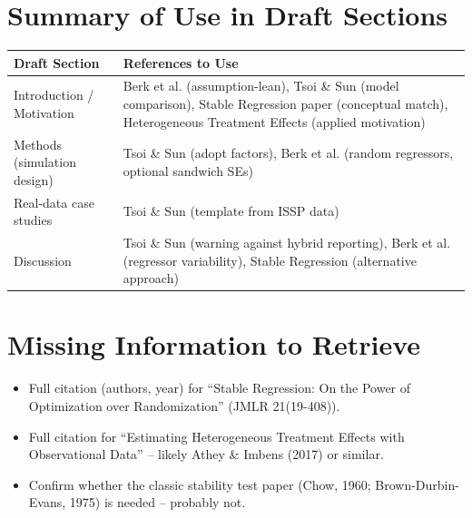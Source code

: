 \documentclass[11pt]{article}
\begin{document}
\section*{Summary of Use in Draft Sections}

\begin{tabular}{|l|p{10cm}|}
\hline
\textbf{Draft Section} & \textbf{References to Use} \\
\hline
Introduction / Motivation & Berk et al. (assumption-lean), Tsoi \& Sun (model comparison), Stable Regression paper (conceptual match), Heterogeneous Treatment Effects (applied motivation) \\
\hline
Methods (simulation design) & Tsoi \& Sun (adopt factors), Berk et al. (random regressors, optional sandwich SEs) \\
\hline
Real-data case studies & Tsoi \& Sun (template from ISSP data) \\
\hline
Discussion & Tsoi \& Sun (warning against hybrid reporting), Berk et al. (regressor variability), Stable Regression (alternative approach) \\
\hline
\end{tabular}

\section*{Missing Information to Retrieve}
\begin{itemize}
    \item Full citation (authors, year) for ``Stable Regression: On the Power of Optimization over Randomization'' (JMLR 21(19-408)).
    \item Full citation for ``Estimating Heterogeneous Treatment Effects with Observational Data'' – likely Athey \& Imbens (2017) or similar.
    \item Confirm whether the classic stability test paper (Chow, 1960; Brown-Durbin-Evans, 1975) is needed – probably not.
\end{itemize}
\end{document}
